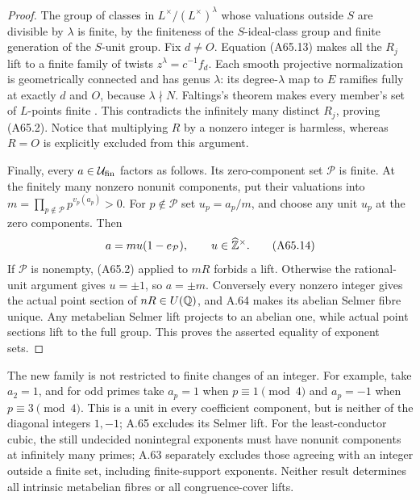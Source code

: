 \begin{proof}
The group of classes in
$L^\times/(L^\times)^\lambda$ whose valuations outside
$S$ are divisible by $\lambda$ is finite, by the
finiteness of the $S$-ideal-class group and finite
generation of the $S$-unit group. Fix $d\ne O$.
Equation (A65.13) makes all the $R_j$ lift to a
finite family of twists
$z^\lambda=c^{-1}f_d$. Each smooth projective
normalization is geometrically connected and has
genus $\lambda$: its degree-$\lambda$ map to $E$
ramifies fully at exactly $d$ and $O$, because
$\lambda\nmid N$. Faltings's theorem makes every
member's set of $L$-points finite
\citep[Satz~7, p.~365, and the correction]{AMFaltings1983,AMFaltings1984Erratum}.
This contradicts the infinitely many distinct
$R_j$, proving (A65.2). Notice that multiplying
$R$ by a nonzero integer is harmless, whereas
$R=O$ is explicitly excluded from this argument.

Finally, every $a\in\mathcal U_{\rm fin}$ factors
as follows. Its zero-component set $\mathcal P$
is finite. At the finitely many nonzero nonunit
components, put their valuations into
$m=\prod_{p\notin\mathcal P}p^{v_p(a_p)}>0$.
For $p\notin\mathcal P$ set $u_p=a_p/m$, and
choose any unit $u_p$ at the zero components.
Then
\[
 a=mu(1-e_{\mathcal P}),\qquad
 u\in\widehat{\mathbb Z}^\times.
 \tag{A65.14}
\]
If $\mathcal P$ is nonempty, (A65.2) applied to
$mR$ forbids a lift. Otherwise the rational-unit
argument gives $u=\pm1$, so $a=\pm m$.
Conversely every nonzero integer gives the actual
point section of $nR\in U(\mathbb Q)$, and A.64 makes
its abelian Selmer fibre unique. Any metabelian
Selmer lift projects to an abelian one, while
actual point sections lift to the full group.
This proves the asserted equality of exponent sets.
\end{proof}

The new family is not restricted to finite changes of an
integer. For example, take $a_2=1$, and for odd primes
take $a_p=1$ when $p\equiv1\pmod4$ and $a_p=-1$ when
$p\equiv3\pmod4$. This is a unit in every coefficient
component, but is neither of the diagonal integers
$1,-1$; A.65 excludes its Selmer lift. For the
least-conductor cubic, the still undecided nonintegral
exponents must have nonunit components at infinitely
many primes; A.63 separately excludes those agreeing
with an integer outside a finite set, including
finite-support exponents. Neither result determines
all intrinsic metabelian fibres or all congruence-cover
lifts.

